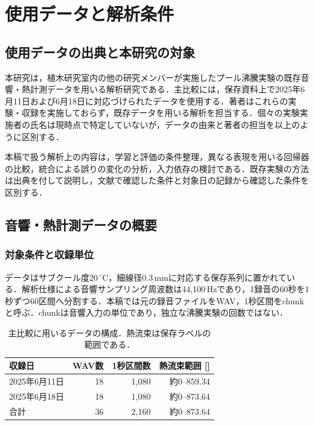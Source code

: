 \chapter{使用データと解析条件}\label{ch:data}
\section{使用データの出典と本研究の対象}
本研究は，植木研究室内の他の研究メンバーが実施したプール沸騰実験の既存音響・熱計測データを用いる解析研究である．主比較には，保存資料上で2025年6月11日および6月18日に対応づけられたデータを使用する．著者はこれらの実験・収録を実施しておらず，既存データを用いる解析を担当する．個々の実験実施者の氏名は現時点で特定していないが，データの由来と著者の担当を以上のように区別する．

本稿で扱う解析上の内容は，学習と評価の条件整理，異なる表現を用いる回帰器の比較，統合による誤りの変化の分析，入力依存の検討である．既存実験の方法は出典を付して説明し，文献で確認した条件と対象日の記録から確認した条件を区別する．

\section{音響・熱計測データの概要}
\subsection{対象条件と収録単位}
データはサブクール度20\,$^\circ$C，細線径0.3\,mmに対応する保存系列に置かれている．解析仕様\cite{localData}による音響サンプリング周波数は44,100\,Hzであり，1録音の60秒を1秒ずつ60区間へ分割する．本稿では元の録音ファイルをWAV，1秒区間をchunkと呼ぶ．chunkは音響入力の単位であり，独立な沸騰実験の回数ではない．

\begin{table}[htbp]
\centering\small
\caption{主比較に用いるデータの構成．熱流束は保存ラベルの範囲である．}
\label{tab:data}
\begin{tabular}{lrrr}
\toprule
収録日 & WAV数 & 1秒区間数 & 熱流束範囲 [\kw{}] \\
\midrule
2025年6月11日 & 18 & 1,080 & 約0--859.34 \\
2025年6月18日 & 18 & 1,080 & 約0--873.64 \\
合計 & 36 & 2,160 & 約0--873.64 \\
\bottomrule
\end{tabular}
\end{table}

